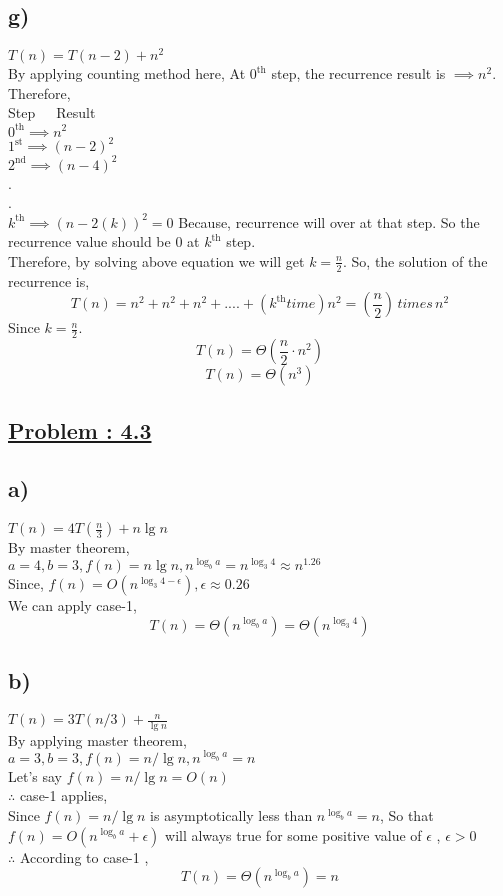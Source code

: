 \documentclass[a4paper, 11pt]{article}
\begin{document}
\subsection*{g)}
$T(n)= T(n-2)+n^2$\\
By applying counting method here,
At $0^{\text{th}}$ step, the recurrence result is $\implies n^2$.\\
Therefore,\\
Step \,\,\,\,\, Result\\
$0^{\text{th}} \implies n^2$\\
$1^{\text{st}} \implies (n-2)^2$\\
$2^{\text{nd}} \implies (n-4)^2$\\
.\\
.\\  
$k^{\text{th}} \implies (n-2(k))^2 =0 $ Because, recurrence will over at that step. So the recurrence value should be 0 at $k^{\text{th}}$ step. \\
Therefore, by solving above equation we will get $k=\frac{n}{2}$.
So, the solution of the recurrence is,
$$T(n) = n^2 + n^2 + n^2 +....+(k^{\text{th}} time)n^2 = (\frac{n}{2})\, times\, n^2$$ Since $k=\frac{n}{2}$.
$$T(n) = \Theta(\frac{n}{2}\cdot n^2)$$
$$T(n) = \Theta(n^3)$$

\subsection*{\underline{Problem : 4.3}}
\subsection*{a)}
$T(n)= 4T(\frac{n}{3}) + n\lg n$\\
By master theorem,\\
$a=4, b=3, f(n) = n \lg n, n^{\log_{b}a}=n^{\log_{3}4} \approx n^{1.26}$\\
Since, $f(n)=O(n^{\log_{3}4 - \epsilon}), \epsilon \approx 0.26$\\
We can apply case-1,
$$T(n) = \Theta (n^{\log_{b}a}) = \Theta(n^{\log_{3}4})$$

\subsection*{b)}
$T(n)= 3T(n/3) + \frac{n}{\lg n}$\\
By applying master theorem, \\
$a=3 , b=3, f(n) = n/ \lg n ,  n^{\log_{b}a} = n$\\
Let's say $f(n)= n/ \lg n = O(n)$\\
$\therefore$ case-1 applies,\\
Since $f(n) = n/ \lg n$ is asymptotically less than  $n^{\log_{b}a} = n$, So that $f(n) = O(n^{\log_{b}a}+\epsilon)$ will always true for some positive value of $\epsilon$ , $\epsilon > 0$\\
$\therefore$ According to case-1 ,
$$T(n) = \Theta ( n^{\log_{b}a}) = n $$
\end{document}
